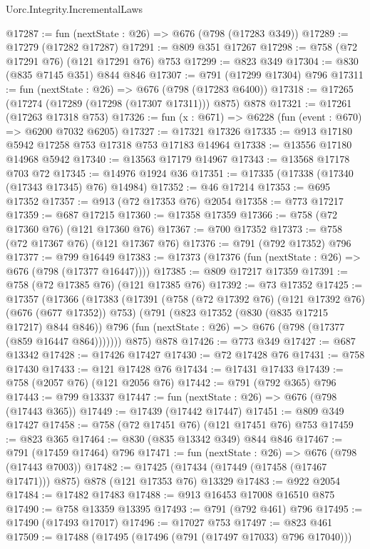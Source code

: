 \begin{lexlean}{Uorc.Integrity.IncrementalLaws}
\begin{coremodule}
@17287 := fun (nextState : @26) => @676 (@798 (@17283 @349))
@17289 := @17279 (@17282 @17287)
@17291 := @809 @351 @17267
@17298 := @758 (@72 @17291 @76) (@121 @17291 @76) @753
@17299 := @823 @349
@17304 := @830 (@835 @7145 @351) @844 @846
@17307 := @791 (@17299 @17304) @796
@17311 := fun (nextState : @26) => @676 (@798 (@17283 @6400))
@17318 := @17265 (@17274 (@17289 (@17298 (@17307 @17311))) @875) @878
@17321 := @17261 (@17263 @17318 @753)
@17326 := fun (x : @671) => @6228 (fun (event : @670) => @6200 @7032 @6205)
@17327 := @17321 @17326
@17335 := @913 @17180 @5942 @17258 @753 @17318 @753 @17183 @14964
@17338 := @13556 @17180 @14968 @5942
@17340 := @13563 @17179 @14967
@17343 := @13568 @17178 @703 @72
@17345 := @14976 @1924 @36
@17351 := @17335 (@17338 (@17340 (@17343 @17345) @76) @14984)
@17352 := @46 @17214
@17353 := @695 @17352
@17357 := @913 (@72 @17353 @76) @2054
@17358 := @773 @17217
@17359 := @687 @17215
@17360 := @17358 @17359
@17366 := @758 (@72 @17360 @76) (@121 @17360 @76)
@17367 := @700 @17352
@17373 := @758 (@72 @17367 @76) (@121 @17367 @76)
@17376 := @791 (@792 @17352) @796
@17377 := @799 @16449
@17383 := @17373 (@17376 (fun (nextState : @26) => @676 (@798 (@17377 @16447))))
@17385 := @809 @17217 @17359
@17391 := @758 (@72 @17385 @76) (@121 @17385 @76)
@17392 := @73 @17352
@17425 := @17357
    (@17366
      (@17383
        (@17391
          (@758 (@72 @17392 @76) (@121 @17392 @76) (@676 (@677 @17352)) @753)
          (@791
            (@823 @17352 (@830 (@835 @17215 @17217) @844 @846))
            @796
            (fun (nextState : @26) => @676 (@798 (@17377 (@859 @16447 @864)))))))
      @875)
    @878
@17426 := @773 @349
@17427 := @687 @13342
@17428 := @17426 @17427
@17430 := @72 @17428 @76
@17431 := @758 @17430
@17433 := @121 @17428 @76
@17434 := @17431 @17433
@17439 := @758 (@2057 @76) (@121 @2056 @76)
@17442 := @791 (@792 @365) @796
@17443 := @799 @13337
@17447 := fun (nextState : @26) => @676 (@798 (@17443 @365))
@17449 := @17439 (@17442 @17447)
@17451 := @809 @349 @17427
@17458 := @758 (@72 @17451 @76) (@121 @17451 @76) @753
@17459 := @823 @365
@17464 := @830 (@835 @13342 @349) @844 @846
@17467 := @791 (@17459 @17464) @796
@17471 := fun (nextState : @26) => @676 (@798 (@17443 @7003))
@17482 := @17425 (@17434 (@17449 (@17458 (@17467 @17471))) @875) @878 (@121 @17353 @76) @13329
@17483 := @922 @2054
@17484 := @17482 @17483
@17488 := @913 @16453 @17008 @16510 @875
@17490 := @758 @13359 @13395
@17493 := @791 (@792 @461) @796
@17495 := @17490 (@17493 @17017)
@17496 := @17027 @753
@17497 := @823 @461
@17509 := @17488
    (@17495 (@17496 (@791 (@17497 @17033) @796 @17040)))

\end{coremodule}
\end{lexlean}
